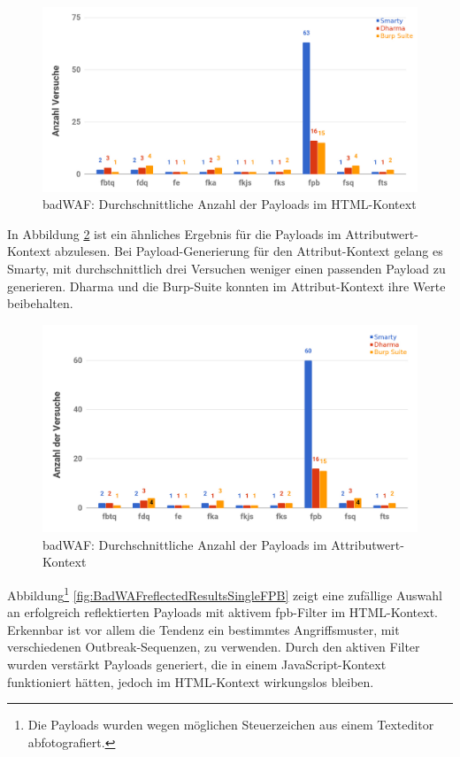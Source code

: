\begin{figure}[htp] 
	\centering
	\includegraphics[width=\textwidth]{contents/images/BadWAFDiagramReflectedFilterHTML}
	\caption{badWAF: Durchschnittliche Anzahl der Payloads im HTML-Kontext}
	\label{fig:BadWAFDiagramReflectedFilterHTML}
\end{figure}

In Abbildung \ref{fig:BadWAFDiagramReflectedFilterAttrVal} ist ein ähnliches Ergebnis für die Payloads im Attributwert-Kontext abzulesen. Bei Payload-Generierung für den Attribut-Kontext gelang es Smarty, mit durchschnittlich drei Versuchen weniger einen passenden Payload zu generieren. Dharma und die Burp-Suite konnten im Attribut-Kontext ihre Werte beibehalten.
 
\begin{figure}[htp] 
	\centering
	\includegraphics[width=\textwidth]{contents/images/BadWAFDiagramReflectedFilterAttrVal}
	\caption{badWAF: Durchschnittliche Anzahl der Payloads im Attributwert-Kontext}
	\label{fig:BadWAFDiagramReflectedFilterAttrVal}
\end{figure}
\FloatBarrier

Abbildung\footnote{Die Payloads wurden wegen möglichen Steuerzeichen aus einem Texteditor abfotografiert.} \ref{fig:BadWAFreflectedResultsSingleFPB} zeigt eine zufällige Auswahl an erfolgreich reflektierten Payloads mit aktivem fpb-Filter im HTML-Kontext. Erkennbar ist vor allem die Tendenz ein bestimmtes Angriffsmuster, mit verschiedenen Outbreak-Sequenzen, zu verwenden. Durch den aktiven Filter wurden verstärkt Payloads generiert, die in einem JavaScript-Kontext funktioniert hätten, jedoch im HTML-Kontext wirkungslos bleiben.

